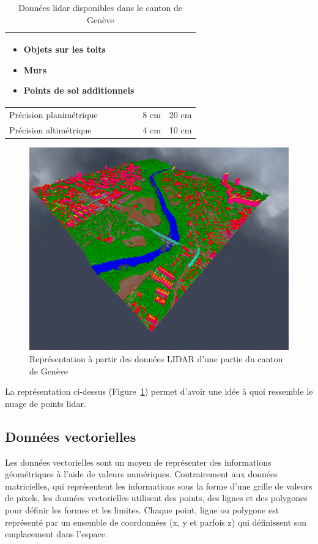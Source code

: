 \begin{table}[H]
\begin{tabular}{|p{2.5cm}|p{5.25cm}|p{5.25cm}|}
\begin{itemize}[leftmargin=*, topsep=0pt, itemsep=0pt, parsep=0pt]
        \item Objets sur les toits
        \item Murs
        \item Points de sol additionnels
    \end{itemize} \\
    \hline
    Précision planimétrique & 8 cm & 20 cm \\
    \hline
    Précision altimétrique & 4 cm & 10 cm \\
    \hline
    \end{tabular}
    \caption{Données \gls{lidar} disponibles dans le canton de Genève}
    \label{tab:lidar_geneve_compact}
\end{table}

\begin{figure}[H]
    \centering
    \includegraphics[width=0.75\linewidth]{03-tail//A1_fondamentaux_ML//A1_figures/A1_19_geneve_lidar.png}
    \caption{Représentation à partir des données LIDAR d’une partie du canton de Genève \cite{sitg_nuages_2023}}
    \label{fig:A1_19_geneve_lidar}
\end{figure}
La représentation ci-dessus (Figure~\ref{fig:A1_19_geneve_lidar}) permet d'avoir une idée à quoi ressemble le nuage de points \gls{lidar}.

\subsection{Données vectorielles}
Les données vectorielles sont un moyen de représenter des informations géométriques à l'aide de valeurs numériques. Contrairement aux données matricielles, qui représentent les informations sous la forme d'une grille de valeurs de pixels, les données vectorielles utilisent des points, des lignes et des polygones pour définir les formes et les limites. Chaque point, ligne ou polygone est représenté par un ensemble de coordonnées (x, y et parfois z) qui définissent son emplacement dans l'espace.

